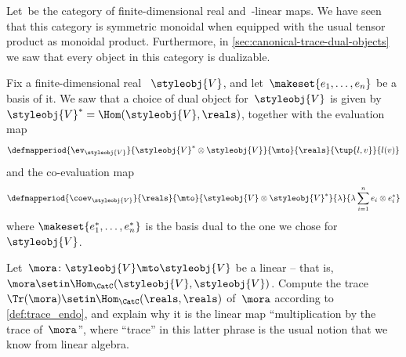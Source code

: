 \begin{gradedexercise}
    \label{ex:LinearAlgebraTrace}
    Let~\CatC be the category of finite-dimensional real  and~\reals-linear maps.
    We have seen that this category is symmetric monoidal when equipped with the usual tensor product as monoidal product.
    Furthermore, in \cref{sec:canonical-trace-dual-objects} we saw that every object in this category is dualizable.

    Fix a finite-dimensional real ~$\styleobj{V}$, and let~$\makeset{e_1,\ldots,e_n }$ be a basis of it.
    We saw that a choice of dual object for~$\styleobj{V}$ is given by~$\styleobj{V}^* = \Hom(\styleobj{V}, \reals)$, together with the evaluation map
    \begin{equation}
        \defmapperiod{
            \ev_\styleobj{V}
        }{
            \styleobj{V}^* \otimes \styleobj{V}
        }{
            \mto
        }{
            \reals
        }{
            \tup{l, v}
        }{
            l(v)
        }
    \end{equation}
    and the co-evaluation map
    \begin{equation}
        \defmapperiod{
            \coev_\styleobj{V}
        }{
            \reals
        }{
            \mto
        }{
            \styleobj{V} \otimes \styleobj{V}^*
        }{
            \lambda
        }{
            \lambda \sum_{i=1}^n e_i \otimes e_i^*
        }
    \end{equation}
    where $\makeset{e_1^*,\ldots,e_n^* }$ is the basis dual to the one we chose for~$\styleobj{V}$.

    Let~$\mora\colon \styleobj{V} \mto \styleobj{V}$ be a linear  -- that is,~$\mora \setin \Hom_{\CatC}(\styleobj{V}, \styleobj{V})$.
    Compute the trace~$\Tr(\mora) \setin \Hom_{\CatC}(\reals, \reals)$ of~$\mora$ according to \cref{def:trace_endo}, and explain why it is the linear map ``multiplication by the trace of~$\mora$'', where ``trace'' in this latter phrase is the usual notion that we know from linear algebra.
\end{gradedexercise}


